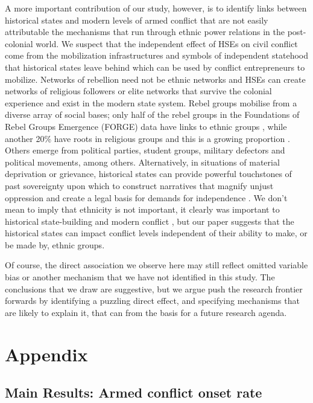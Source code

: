 A more important contribution of our study, however, is to identify links
between historical states and modern levels of armed conflict that are not
easily attributable the mechanisms that run through ethnic power relations in
the post-colonial world. We suspect that the independent effect of HSEs on civil
conflict come from the mobilization infrastructures and symbols of independent
statehood that historical states leave behind which can be used by conflict
entrepreneurs to mobilize.  Networks of rebellion need not be ethnic networks
\citep{Staniland2014} and HSEs can create networks of religious followers or
elite networks that survive the colonial experience and exist in the modern
state system. Rebel groups mobilise from a diverse array of social bases; only
half of the rebel groups in the Foundations of Rebel Groups Emergence (FORGE)
data have links to ethnic groups \citep{Braithwaite2020}, while another 20\%
have roots in religious groups and this is a growing proportion
\citep{Svensson2019}. Others emerge from political parties, student groups,
military defectors and political movements, among others. Alternatively, in
situations of material deprivation or grievance, historical states can provide
powerful touchstones of past sovereignty upon which to construct narratives that
magnify unjust oppression and create a legal basis for demands for independence
\citep{Ahram2019, Shelef2016}. We don't mean to imply that ethnicity is not
important, it clearly was important to historical state-building
\citep{Herbst2014} and modern conflict \citep{Cederman2013}, but our paper
suggests that the historical states can impact conflict levels independent of
their ability to make, or be made by, ethnic groups. 

Of course, the direct association we observe here may still reflect omitted
variable bias or another mechanism that we have not identified in this study.
The conclusions that we draw are suggestive, but we argue push the research
frontier forwards by identifying a puzzling direct effect, and specifying
mechanisms that are likely to explain it, that can from the basis for a future
research agenda. 
    
\clearpage 
 

\clearpage 

\section{Appendix}

\subsection{Main Results: Armed conflict onset rate}

